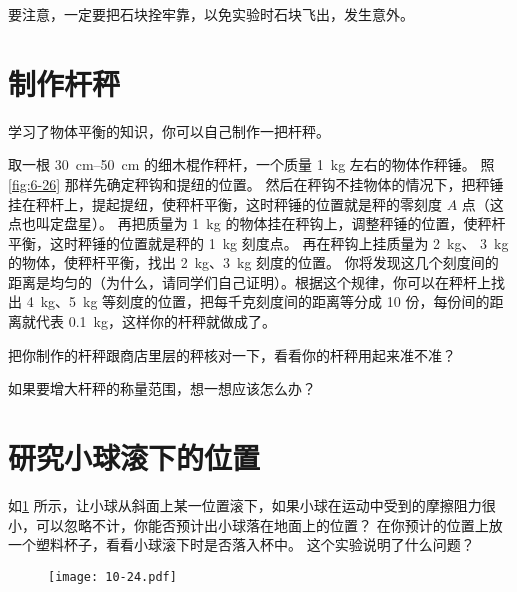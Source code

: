 \medskip
要注意，一定要把石块拴牢靠，以免实验时石块飞出，发生意外。

\section{制作杆秤}
学习了物体平衡的知识，你可以自己制作一把杆秤。

取一根 \qtyrange{30}{50}{cm} 的细木棍作秤杆，一个质量 \qty{1}{kg} 左右的物体作秤锤。
照\cref{fig:6-26} 那样先确定秤钩和提纽的位置。
然后在秤钩不挂物体的情况下，把秤锤挂在秤杆上，提起提纽，使秤杆平衡，这时秤锤的位置就是秤的零刻度 $A$ 点（这点也叫定盘星）。
再把质量为 \qty{1}{kg} 的物体挂在秤钩上，调整秤锤的位置，使秤杆平衡，这时秤锤的位置就是秤的 \qty{1}{kg} 刻度点。
再在秤钩上挂质量为 \qty{2}{kg}、 \qty{3}{kg} 的物体，使秤杆平衡，找出 \qty{2}{kg}、\qty{3}{kg} 刻度的位置。
你将发现这几个刻度间的距离是均匀的（为什么，请同学们自己证明）。根据这个规律，你可以在秤杆上找出 \qty{4}{kg}、\qty{5}{kg} 等刻度的位置，把每千克刻度间的距离等分成 10 份，每份间的距离就代表 \qty{0.1}{kg}，这样你的杆秤就做成了。

把你制作的杆秤跟商店里层的秤核对一下，看看你的杆秤用起来准不准？

如果要增大杆秤的称量范围，想一想应该怎么办？

\section{研究小球滚下的位置}
如\cref{fig:10-24} 所示，让小球从斜面上某一位置滚下，如果小球在运动中受到的摩擦阻力很小，可以忽略不计，你能否预计出小球落在地面上的位置？
在你预计的位置上放一个塑料杯子，看看小球滚下时是否落入杯中。
这个实验说明了什么问题？
\begin{figure}
  \texttt{[image: 10-24.pdf]}
  \caption{}\label{fig:10-24}
\end{figure}
